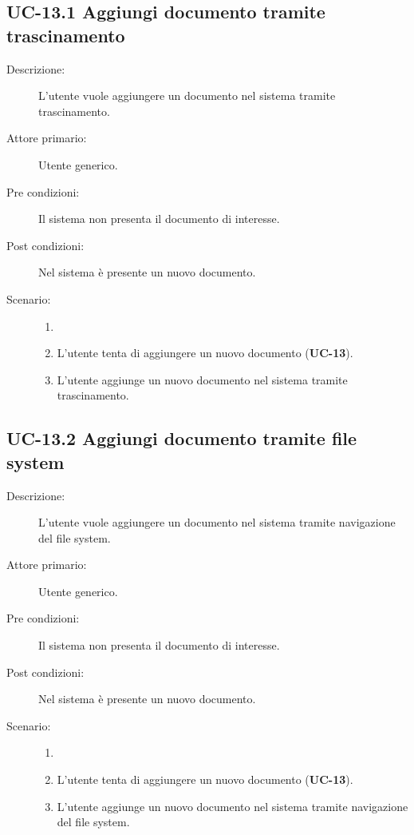 \subsection{UC-13.1 Aggiungi documento tramite trascinamento}
\begin{description}
    \item[Descrizione:] L'utente vuole aggiungere un documento nel sistema tramite trascinamento.
    \item[Attore primario:] Utente generico.
    \item[Pre condizioni:] Il sistema non presenta il documento di interesse.
    \item[Post condizioni:] Nel sistema è presente un nuovo documento.
    \item[Scenario:] 
    \begin{enumerate}
        \item[]
        \item L’utente tenta di aggiungere un nuovo documento (\textbf{UC-13}).
        \item L'utente aggiunge un nuovo documento nel sistema tramite trascinamento.
    \end{enumerate}
\end{description}

\subsection{UC-13.2 Aggiungi documento tramite file system}
\begin{description}
    \item[Descrizione:] L'utente vuole aggiungere un documento nel sistema tramite navigazione del file system.
    \item[Attore primario:] Utente generico.
    \item[Pre condizioni:] Il sistema non presenta il documento di interesse.
    \item[Post condizioni:] Nel sistema è presente un nuovo documento.
    \item[Scenario:]
    \begin{enumerate}
        \item[]
        \item L’utente tenta di aggiungere un nuovo documento (\textbf{UC-13}).
        \item L'utente aggiunge un nuovo documento nel sistema tramite navigazione del file system.
    \end{enumerate}
\end{description}

